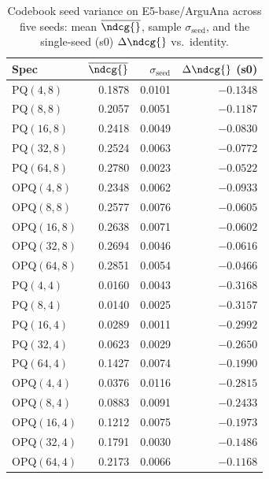 \begin{table}[t]
\centering
\small
\caption{Codebook seed variance on E5-base/ArguAna across five seeds: mean $\overline{\ndcg{}}$, sample $\sigma_{\text{seed}}$, and the single-seed (s0) $\Delta\ndcg{}$ vs.\ identity.}
\label{tab:seed-variance-e5-base-arguana}
\begin{tabular}{lrrr}
\toprule
Spec & $\overline{\ndcg{}}$ & $\sigma_{\text{seed}}$ & $\Delta\ndcg{}$ (s0) \\
\midrule
PQ$(4,8)$ & 0.1878 & 0.0101 & $-0.1348$ \\
PQ$(8,8)$ & 0.2057 & 0.0051 & $-0.1187$ \\
PQ$(16,8)$ & 0.2418 & 0.0049 & $-0.0830$ \\
PQ$(32,8)$ & 0.2524 & 0.0063 & $-0.0772$ \\
PQ$(64,8)$ & 0.2780 & 0.0023 & $-0.0522$ \\
OPQ$(4,8)$ & 0.2348 & 0.0062 & $-0.0933$ \\
OPQ$(8,8)$ & 0.2577 & 0.0076 & $-0.0605$ \\
OPQ$(16,8)$ & 0.2638 & 0.0071 & $-0.0602$ \\
OPQ$(32,8)$ & 0.2694 & 0.0046 & $-0.0616$ \\
OPQ$(64,8)$ & 0.2851 & 0.0054 & $-0.0466$ \\
PQ$(4,4)$ & 0.0160 & 0.0043 & $-0.3168$ \\
PQ$(8,4)$ & 0.0140 & 0.0025 & $-0.3157$ \\
PQ$(16,4)$ & 0.0289 & 0.0011 & $-0.2992$ \\
PQ$(32,4)$ & 0.0623 & 0.0029 & $-0.2650$ \\
PQ$(64,4)$ & 0.1427 & 0.0074 & $-0.1990$ \\
OPQ$(4,4)$ & 0.0376 & 0.0116 & $-0.2815$ \\
OPQ$(8,4)$ & 0.0883 & 0.0091 & $-0.2433$ \\
OPQ$(16,4)$ & 0.1212 & 0.0075 & $-0.1973$ \\
OPQ$(32,4)$ & 0.1791 & 0.0030 & $-0.1486$ \\
OPQ$(64,4)$ & 0.2173 & 0.0066 & $-0.1168$ \\
\bottomrule
\end{tabular}
\end{table}

